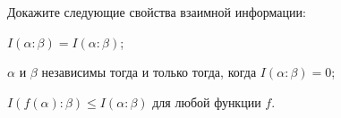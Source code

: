 Докажите следующие свойства взаимной информации:
\begin{enumcyr}
    \item $I(\alpha : \beta) = I(\alpha : \beta)$;
    \item $\alpha$ и $\beta$ независимы тогда и только тогда, когда $I(\alpha : \beta) = 0$;
    \item $I(f(\alpha) : \beta) \le I(\alpha : \beta)$ для любой функции $f$.
\end{enumcyr}